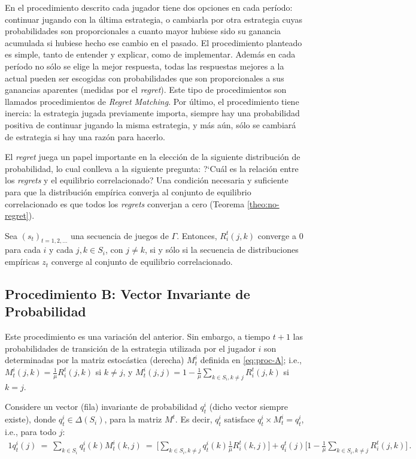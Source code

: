 En el procedimiento descrito cada jugador tiene dos opciones en cada período: continuar jugando con la última estrategia, o cambiarla por otra estrategia cuyas probabilidades son proporcionales a cuanto mayor hubiese sido su ganancia acumulada si hubiese hecho ese cambio en el pasado. El procedimiento planteado es simple, tanto de entender y explicar, como de implementar. Además en cada período no sólo se elige la mejor respuesta, todas las respuestas mejores a la actual pueden ser escogidas con probabilidades que son proporcionales a sus ganancias aparentes (medidas por el \textit{regret}). Este tipo de procedimientos son llamados procedimientos de \textit{Regret Matching}. Por último, el procedimiento tiene inercia: la estrategia jugada previamente importa, siempre hay una probabilidad positiva de continuar jugando la misma estrategia, y más aún, sólo se cambiará de estrategia si hay una razón para hacerlo.

El \textit{regret} juega un papel importante en la elección de la siguiente distribución de probabilidad, lo cual conlleva a la siguiente pregunta: ?`Cuál es la relación entre los \textit{regrets} y el equilibrio correlacionado? Una condición necesaria y suficiente para que la distribución empírica converja al conjunto de equilibrio correlacionado es que todos los \textit{regrets} converjan a cero (Teorema \ref{theo:no-regret}).

\begin{theorem}
\label{theo:no-regret}
Sea $(s_t)_{t = 1, 2, ...}$ una secuencia de juegos de $\Gamma$.
Entonces, $R_i^t(j, k)$ converge a $0$ para cada $i$ y cada $j, k \in S_i$, con $j \neq k$, si y sólo si la secuencia de distribuciones empíricas $z_t$ converge al conjunto de equilibrio correlacionado.
\end{theorem}

\subsection*{Procedimiento B: Vector Invariante de Probabilidad}

Este procedimiento es una variación del anterior. Sin embargo, a tiempo $t+1$ las probabilidades de transición de la estrategia utilizada por el jugador $i$ son determinadas por la matriz estocástica (derecha) $M^i_t$ definida en \eqref{eq:proc-A}; i.e., $M^i_t(j,k)=\frac{1}{\mu}R^t_i(j,k)$ si $k\neq j$, y $M^i_t(j,j)=1-\frac{1}{\mu}\sum_{k\in S_i,k\neq j} R^t_i(j,k)$ si $k=j$.

Considere un vector (fila) invariante de probabilidad $q^i_t$ (dicho vector siempre existe), donde $q^i_t\in \Delta(S_i)$, para la matriz $M^t$. Es decir, $q^i_t$ satisface $q^i_t \times M^i_t = q^i_t$, i.e., para todo $j$:
\begin{alignat}{1}
\label{eq:def-inv-vector}
  q^i_t(j)\ 
    =\ \sum_{k\in S_i} q^i_t(k) M^i_t(k,j)\ 
    =\ \bigg[\sum_{k \in S_i, k \neq j} q^i_t(k)\frac{1}{\mu}R^t_i(k,j)\bigg] + q_i^t(j)\biggl[1 - \frac{1}{\mu}\sum_{k \in S_i, k \neq j} R^t_i(j,k)\biggr]\,.
\end{alignat}

